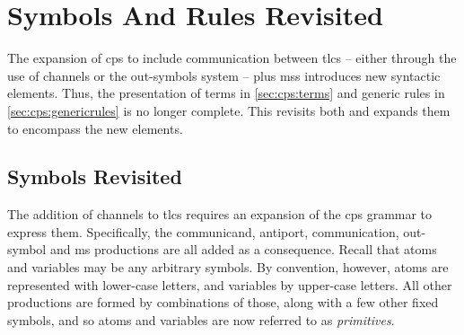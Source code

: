 \section{\label{sec:cps:termsandrulesrevisited}Symbols And Rules Revisited}
The expansion of \gls{cps} to include communication between \glspl{tlc} -- either through the use of channels or the out-symbols system -- plus \glspl{ms} introduces new syntactic elements.  Thus, the presentation of terms in \cref{sec:cps:terms} and generic rules in \cref{sec:cps:genericrules} is no longer complete.  This  revisits both and expands them to encompass the new elements.

\subsection{\label{sec:cps:symbolsrevisited}Symbols Revisited}

The addition of channels to \glspl{tlc} requires an expansion of the \gls{cps} grammar to express them.  Specifically, the communicand, antiport, communication, out-symbol and \gls{ms} productions are all added as a consequence.  Recall that atoms and variables may be any arbitrary symbols.  By convention, however, atoms are represented with lower-case letters, and variables by upper-case letters.  All other productions are formed by combinations of those, along with a few other fixed symbols, and so atoms and variables are now referred to as \emph{primitives}.

